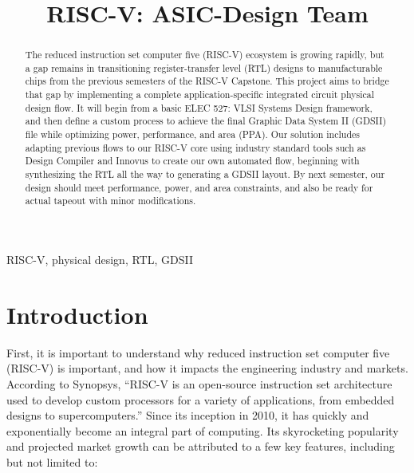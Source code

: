 \documentclass[conference]{IEEEtran}
\begin{document}
\title{RISC-V: ASIC-Design Team}

\author{
\and
{}
}

\maketitle

\begin{abstract}
The reduced instruction set computer five (RISC-V) ecosystem is growing rapidly, but a gap remains in transitioning register-transfer level (RTL) designs to manufacturable chips from the previous semesters of the RISC-V Capstone. This project aims to bridge that gap by implementing a complete application-specific integrated circuit physical design flow. It will begin from a basic ELEC 527: VLSI Systems Design framework, and then define a custom process to achieve the final Graphic Data System II (GDSII) file while optimizing power, performance, and area (PPA). Our solution includes adapting previous flows to our RISC-V core using industry standard tools such as Design Compiler and Innovus to create our own automated flow, beginning with synthesizing the RTL all the way to generating a GDSII layout. By next semester, our design should meet performance, power, and area constraints, and also be ready for actual tapeout with minor modifications.
\end{abstract}

\begin{IEEEkeywords}
RISC-V, physical design, RTL, GDSII
\end{IEEEkeywords}

\section{Introduction}
First, it is important to understand why reduced instruction set computer five (RISC-V) is important, and how it impacts the engineering industry and markets. According to Synopsys, “RISC-V is an open-source instruction set architecture used to develop custom processors for a variety of applications, from embedded designs to supercomputers.” \cite{b1} Since its inception in 2010, it has quickly and exponentially become an integral part of computing. Its skyrocketing popularity and projected market growth can be attributed to a few key features, including but not limited to:
\end{document}
